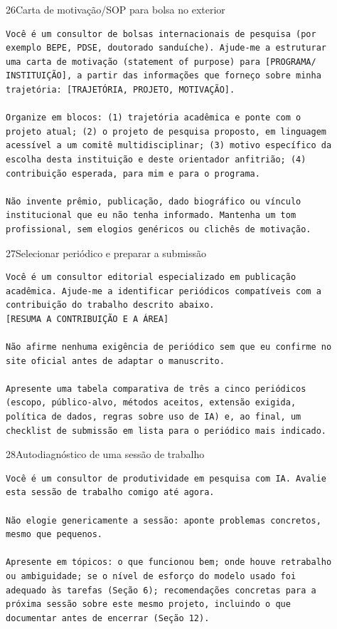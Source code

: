 \documentclass[11pt,a4paper]{article}
\begin{document}
\begin{modelo}{26}{Carta de motivação/SOP para bolsa no exterior}
\begin{lstlisting}
Você é um consultor de bolsas internacionais de pesquisa (por
exemplo BEPE, PDSE, doutorado sanduíche). Ajude-me a estruturar
uma carta de motivação (statement of purpose) para [PROGRAMA/
INSTITUIÇÃO], a partir das informações que forneço sobre minha
trajetória: [TRAJETÓRIA, PROJETO, MOTIVAÇÃO].

Organize em blocos: (1) trajetória acadêmica e ponte com o
projeto atual; (2) o projeto de pesquisa proposto, em linguagem
acessível a um comitê multidisciplinar; (3) motivo específico da
escolha desta instituição e deste orientador anfitrião; (4)
contribuição esperada, para mim e para o programa.

Não invente prêmio, publicação, dado biográfico ou vínculo
institucional que eu não tenha informado. Mantenha um tom
profissional, sem elogios genéricos ou clichês de motivação.
\end{lstlisting}
\end{modelo}

\begin{modelo}{27}{Selecionar periódico e preparar a submissão}
\begin{lstlisting}
Você é um consultor editorial especializado em publicação
acadêmica. Ajude-me a identificar periódicos compatíveis com a
contribuição do trabalho descrito abaixo.
[RESUMA A CONTRIBUIÇÃO E A ÁREA]

Não afirme nenhuma exigência de periódico sem que eu confirme no
site oficial antes de adaptar o manuscrito.

Apresente uma tabela comparativa de três a cinco periódicos
(escopo, público-alvo, métodos aceitos, extensão exigida,
política de dados, regras sobre uso de IA) e, ao final, um
checklist de submissão em lista para o periódico mais indicado.
\end{lstlisting}
\end{modelo}

\begin{modelo}{28}{Autodiagnóstico de uma sessão de trabalho}
\begin{lstlisting}
Você é um consultor de produtividade em pesquisa com IA. Avalie
esta sessão de trabalho comigo até agora.

Não elogie genericamente a sessão: aponte problemas concretos,
mesmo que pequenos.

Apresente em tópicos: o que funcionou bem; onde houve retrabalho
ou ambiguidade; se o nível de esforço do modelo usado foi
adequado às tarefas (Seção 6); recomendações concretas para a
próxima sessão sobre este mesmo projeto, incluindo o que
documentar antes de encerrar (Seção 12).
\end{lstlisting}
\end{modelo}
\end{document}

